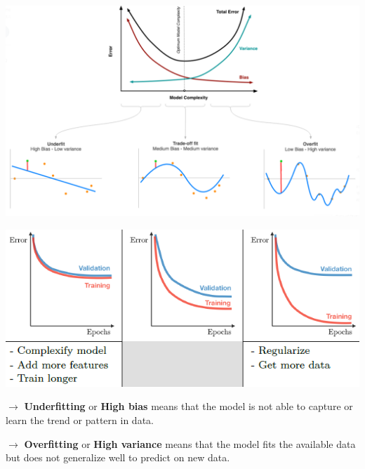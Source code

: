 \documentclass[letterpaper, 10.5pt,landscape]{article}
\begin{document}
\begin{multicols*}{3}
\begin{center}
    \begin{minipage}{\linewidth}
        \includegraphics[width=\textwidth]{figures/bias_variance_overfitting_underfitting.PNG}
    \end{minipage}
\end{center}

\vspace{-5mm}

\begin{center}
    \begin{minipage}{0.9\linewidth}
        \includegraphics[width=\textwidth]{figures/bias_variance_overfitting_underfitting_LearningCurves.PNG}
    \end{minipage}
\end{center}


$\rightarrow$ \textbf{Underfitting} or \textbf{High bias} means that the model is not able to capture or learn the trend or pattern in data.

$\rightarrow$ \textbf{Overfitting} or \textbf{High variance} means that the model fits the available data but does not generalize well to predict on new data.


\end{multicols*}
\end{document}
